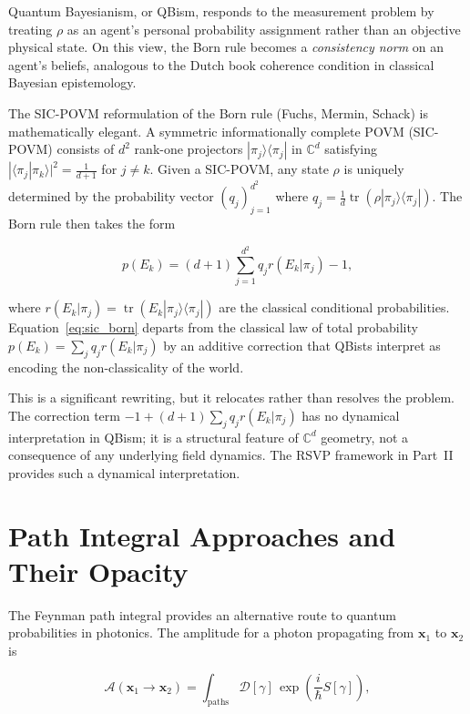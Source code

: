 \documentclass[11pt, openright, twoside]{book}
\theoremstyle{plain}
\theoremstyle{definition}
\theoremstyle{remark}
\newcommand{\xvec}{\mathbf{x}}
\begin{document}
Quantum Bayesianism, or QBism, responds to the measurement problem by treating $\rho$ as
an agent's personal probability assignment rather than an objective physical state. On this
view, the Born rule becomes a \emph{consistency norm} on an agent's beliefs, analogous to the
Dutch book coherence condition in classical Bayesian epistemology.

The SIC-POVM reformulation of the Born rule (Fuchs, Mermin, Schack) is mathematically elegant.
A symmetric informationally complete POVM (SIC-POVM) consists of $d^2$ rank-one projectors
$|\pi_j\rangle\langle\pi_j|$ in $\mathbb{C}^d$ satisfying
$|\langle\pi_j|\pi_k\rangle|^2 = \frac{1}{d+1}$ for $j \neq k$.
Given a SIC-POVM, any state $\rho$ is uniquely determined by the probability vector
$(q_j)_{j=1}^{d^2}$ where $q_j = \frac{1}{d}\operatorname{tr}(\rho |\pi_j\rangle\langle\pi_j|)$.
The Born rule then takes the form

\begin{equation}
  p(E_k) = (d+1)\sum_{j=1}^{d^2} q_j r(E_k | \pi_j) - 1,
  \label{eq:sic_born}
\end{equation}

where $r(E_k|\pi_j) = \operatorname{tr}(E_k |\pi_j\rangle\langle\pi_j|)$ are the classical
conditional probabilities. Equation~\eqref{eq:sic_born} departs from the classical law of
total probability $p(E_k) = \sum_j q_j r(E_k|\pi_j)$ by an additive correction that QBists
interpret as encoding the non-classicality of the world.

This is a significant rewriting, but it relocates rather than resolves the problem. The
correction term $-1 + (d+1)\sum_j q_j r(E_k|\pi_j)$ has no dynamical interpretation in
QBism; it is a structural feature of $\mathbb{C}^d$ geometry, not a consequence of any
underlying field dynamics. The RSVP framework in Part~II provides such a dynamical interpretation.

\section{Path Integral Approaches and Their Opacity}

The Feynman path integral provides an alternative route to quantum probabilities in photonics.
The amplitude for a photon propagating from $\xvec_1$ to $\xvec_2$ is

\begin{equation}
  \mathcal{A}(\xvec_1 \to \xvec_2) = \int_{\text{paths}} \mathcal{D}[\gamma]\,
  \exp\!\left(\frac{i}{\hbar} S[\gamma]\right),
  \label{eq:path_integral}
\end{equation}
\end{document}
